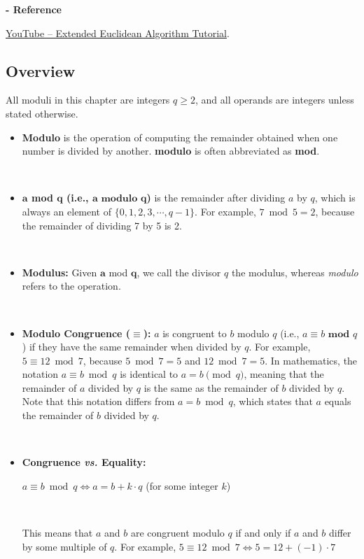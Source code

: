 
\noindent \textbf{- Reference} 

\href{https://www.youtube.com/watch?v=fz1vxq5ts5I}{YouTube -- Extended Euclidean Algorithm Tutorial}.


\subsection{Overview}
\label{subsec:modulo-overview}

All moduli in this chapter are integers $q\ge 2$, and all operands are integers unless stated otherwise.

\begin{tcolorbox}[title={\textbf{\tboxdef{\ref*{subsec:modulo-overview}} Integer Modulo}}]

\begin{itemize}

\item \textbf{Modulo} is the operation of computing the remainder obtained when one number is divided by another. \textbf{modulo} is often abbreviated as \textbf{mod}.

$ $

\item \textbf{$\bm{a}$ mod $\bm{q}$ (i.e., $\bm{a} \bm{\text{ modulo } q}$)} is the remainder after dividing $a$ by $q$, which is always an element of $\{0, 1, 2, 3, \cdots, q-1\}$. For example, $7 \bmod 5 = 2$, because the remainder of dividing 7 by 5 is 2. 

$ $

\item \textbf{Modulus:} Given $\bm{a}$ mod $\bm{q}$, we call the divisor $q$ the modulus, whereas \emph{modulo} refers to the operation.

$ $

\item \textbf{Modulo Congruence ($\bm{\equiv}$):} $a$ is congruent to $b$ modulo $q$ (i.e., $a \equiv b \textbf{ mod } q$) if they have the same remainder when divided by $q$. For example, $5 \equiv 12 \bmod 7$, because $5 \bmod 7 = 5$ and $12 \bmod 7 = 5$. In mathematics, the notation $a \equiv b \bmod q$ is identical to $a = b \pmod q$, meaning that the remainder of $a$ divided by $q$ is the same as the remainder of $b$ divided by $q$. Note that this notation differs from $a = b \bmod q$, which states that $a$ equals the remainder of $b$ divided by $q$.

$ $

\item \textbf{Congruence \textit{vs.} Equality:} 

$a \equiv b \bmod q \Longleftrightarrow a = b + k\cdot q$ \text{ } (for some integer $k$)

$ $

This means that $a$ and $b$ are congruent modulo $q$ if and only if $a$ and $b$ differ by some multiple of $q$. For example, $5 \equiv 12 \bmod 7 \Longleftrightarrow 5 = 12 + (-1)\cdot 7$

\end{itemize}

\end{tcolorbox}



